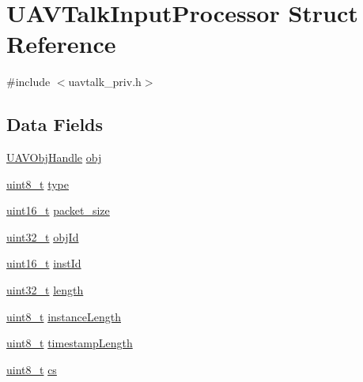 \hypertarget{struct_u_a_v_talk_input_processor}{\section{U\-A\-V\-Talk\-Input\-Processor Struct Reference}
\label{struct_u_a_v_talk_input_processor}
}


{\ttfamily \#include $<$uavtalk\-\_\-priv.\-h$>$}

\subsection*{Data Fields}
\begin{DoxyCompactItemize}
\item 
\hyperlink{group___n_a_m_e_gac31715ab50a1903838e7d87c8022ec75}{U\-A\-V\-Obj\-Handle} \hyperlink{struct_u_a_v_talk_input_processor_a78153a61f3d6bd1097e51b65f176c341}{obj}
\item 
\hyperlink{stdint_8h_aba7bc1797add20fe3efdf37ced1182c5}{uint8\-\_\-t} \hyperlink{struct_u_a_v_talk_input_processor_a65de259b3813b2be47d056480622bcbc}{type}
\item 
\hyperlink{stdint_8h_a273cf69d639a59973b6019625df33e30}{uint16\-\_\-t} \hyperlink{struct_u_a_v_talk_input_processor_a21adf6a8fc9bfc307b883a7b8ff412d1}{packet\-\_\-size}
\item 
\hyperlink{stdint_8h_a435d1572bf3f880d55459d9805097f62}{uint32\-\_\-t} \hyperlink{struct_u_a_v_talk_input_processor_a02e62fc516bd524be74fd36898116d52}{obj\-Id}
\item 
\hyperlink{stdint_8h_a273cf69d639a59973b6019625df33e30}{uint16\-\_\-t} \hyperlink{struct_u_a_v_talk_input_processor_a5cd40d45450a1bd25688d47bec6c237a}{inst\-Id}
\item 
\hyperlink{stdint_8h_a435d1572bf3f880d55459d9805097f62}{uint32\-\_\-t} \hyperlink{struct_u_a_v_talk_input_processor_aed838e1ff0464bc7a7a2c83d699cbb26}{length}
\item 
\hyperlink{stdint_8h_aba7bc1797add20fe3efdf37ced1182c5}{uint8\-\_\-t} \hyperlink{struct_u_a_v_talk_input_processor_ab2cadd287203a554072316545674d14c}{instance\-Length}
\item 
\hyperlink{stdint_8h_aba7bc1797add20fe3efdf37ced1182c5}{uint8\-\_\-t} \hyperlink{struct_u_a_v_talk_input_processor_ae5fadf5b763839a191f044b2a2492366}{timestamp\-Length}
\item 
\hyperlink{stdint_8h_aba7bc1797add20fe3efdf37ced1182c5}{uint8\-\_\-t} \hyperlink{struct_u_a_v_talk_input_processor_a7e4bd3c94cfc37e346d4ce38445ca742}{cs}

\end{DoxyCompactItemize}
